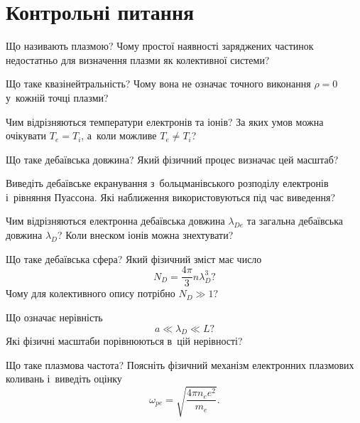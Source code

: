 \section*{Контрольні питання}



 {}

\begin{Questions}
	\begin{quizlist}
		\item Що називають плазмою? Чому простої наявності заряджених частинок недостатньо для визначення плазми як колективної системи?

		\item Що таке квазінейтральність? Чому вона не означає точного виконання $\rho=0$ у~кожній точці плазми?

		\item Чим відрізняються температури електронів та іонів? За яких умов можна очікувати $T_e=T_i$, а~коли можливе $T_e\ne T_i$?

		\item Що таке дебаївська довжина? Який фізичний процес визначає цей масштаб?

		\item Виведіть дебаївське екранування з~больцманівського розподілу електронів і~рівняння Пуассона. Які наближення використовуються під час виведення?

		\item Чим відрізняються електронна дебаївська довжина $\lambda_{De}$ та загальна дебаївська довжина $\lambda_D$? Коли внеском іонів можна знехтувати?

		\item Що таке дебаївська сфера? Який фізичний зміст має число
		\begin{equation*}
			N_D=\frac{4\pi}{3}n\lambda_D^3?
		\end{equation*}
		Чому для колективного опису потрібно $N_D\gg1$?

		\item Що означає нерівність
		\begin{equation*}
			a\ll\lambda_D\ll L?
		\end{equation*}
		Які фізичні масштаби порівнюються в~цій нерівності?

		\item Що таке плазмова частота? Поясніть фізичний механізм електронних плазмових коливань і~виведіть оцінку
		\begin{equation*}
			\omega_{pe}
			=\sqrt{\frac{4\pi n_e e^2}{m_e}}.
		\end{equation*}


\end{quizlist}
\end{Questions}
